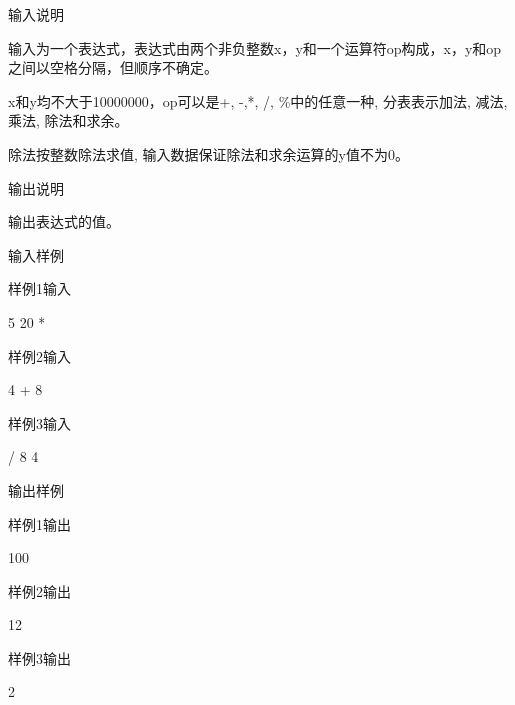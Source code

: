 输入说明
	
输入为一个表达式，表达式由两个非负整数x，y和一个运算符op构成，x，y和op之间以空格分隔，但顺序不确定。

x和y均不大于10000000，op可以是+, -,*, /, \%中的任意一种, 分表表示加法, 减法, 乘法, 除法和求余。

除法按整数除法求值, 输入数据保证除法和求余运算的y值不为0。

输出说明	

输出表达式的值。

输入样例
	
样例1输入

5 20 *

样例2输入

4 + 8

样例3输入

/ 8 4

输出样例
	
样例1输出

100

样例2输出

12

样例3输出

2

